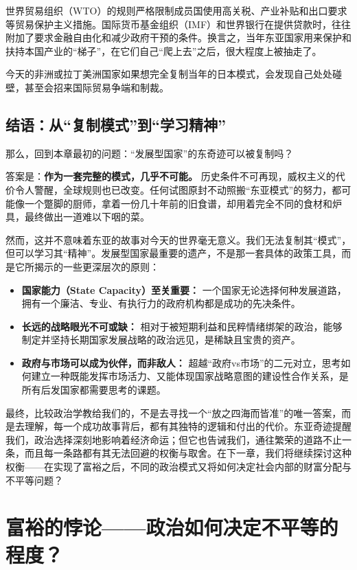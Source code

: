 \documentclass[a5paper, 11pt, openany]{ctexbook}
\begin{document}
世界贸易组织（WTO）的规则严格限制成员国使用高关税、产业补贴和出口要求等贸易保护主义措施。国际货币基金组织（IMF）和世界银行在提供贷款时，往往附加了要求金融自由化和减少政府干预的条件。换言之，当年东亚国家用来保护和扶持本国产业的“梯子”，在它们自己“爬上去”之后，很大程度上被抽走了。

今天的非洲或拉丁美洲国家如果想完全复制当年的日本模式，会发现自己处处碰壁，甚至会招来国际贸易争端和制裁。

\section*{结语：从“复制模式”到“学习精神”}

那么，回到本章最初的问题：“发展型国家”的东奇迹可以被复制吗？

答案是：\textbf{作为一套完整的模式，几乎不可能。} 历史条件不可再现，威权主义的代价令人警醒，全球规则也已改变。任何试图原封不动照搬“东亚模式”的努力，都可能像一个蹩脚的厨师，拿着一份几十年前的旧食谱，却用着完全不同的食材和炉具，最终做出一道难以下咽的菜。

然而，这并不意味着东亚的故事对今天的世界毫无意义。我们无法复制其“模式”，但可以学习其“精神”。发展型国家最重要的遗产，不是那一套具体的政策工具，而是它所揭示的一些更深层次的原则：
\begin{itemize}
    \item \textbf{国家能力（State Capacity）至关重要：} 一个国家无论选择何种发展道路，拥有一个廉洁、专业、有执行力的政府机构都是成功的先决条件。
    \item \textbf{长远的战略眼光不可或缺：} 相对于被短期利益和民粹情绪绑架的政治，能够制定并坚持长期国家发展战略的政治远见，是稀缺且宝贵的资产。
    \item \textbf{政府与市场可以成为伙伴，而非敌人：} 超越“政府vs市场”的二元对立，思考如何建立一种既能发挥市场活力、又能体现国家战略意图的建设性合作关系，是所有后发国家都需要思考的课题。
\end{itemize}

最终，比较政治学教给我们的，不是去寻找一个“放之四海而皆准”的唯一答案，而是去理解，每一个成功故事背后，都有其独特的逻辑和付出的代价。东亚奇迹提醒我们，政治选择深刻地影响着经济命运；但它也告诫我们，通往繁荣的道路不止一条，而且每一条路都有其无法回避的权衡与取舍。在下一章，我们将继续探讨这种权衡——在实现了富裕之后，不同的政治模式又将如何决定社会内部的财富分配与不平等问题？

\chapter{富裕的悖论——政治如何决定不平等的程度？}
\end{document}
